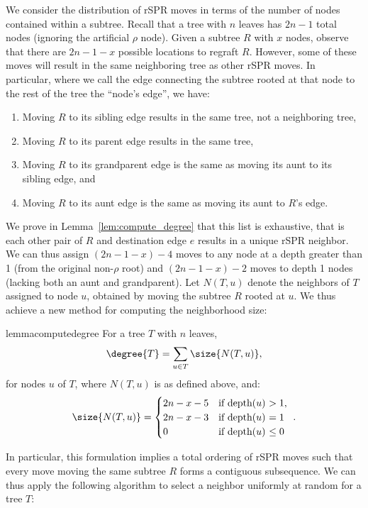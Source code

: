 \documentclass[11pt,onecolumn,conference]{IEEEtran}
\begin{document}
We consider the distribution of rSPR moves in terms of the number of nodes contained within a subtree.
Recall that a tree with $n$ leaves has $2n-1$ total nodes (ignoring the artificial $\rho$ node).
Given a subtree $R$ with $x$ nodes, observe that there are $2n-1 - x$ possible locations to regraft $R$.
However, some of these moves will result in the same neighboring tree as other rSPR moves.
In particular, where we call the edge connecting the subtree rooted at that node to the rest of the tree the ``node's edge'', we have:
\begin{enumerate}
\item Moving $R$ to its sibling edge results in the same tree, not a neighboring tree,
\item Moving $R$ to its parent edge results in the same tree,
\item Moving $R$ to its grandparent edge is the same as moving its aunt to its sibling edge, and
\item Moving $R$ to its aunt edge is the same as moving its aunt to $R$'s edge.
\end{enumerate}
We prove in Lemma~\ref{lem:compute_degree} that this list is exhaustive, that is each other pair of $R$ and destination edge $e$ results in a unique rSPR neighbor.
We can thus assign $(2n-1-x)-4$ moves to any node at a depth greater than 1 (from the original non-$\rho$ root) and $(2n-1-x)-2$ moves to depth 1 nodes (lacking both an aunt and grandparent).
Let $N(T,u)$ denote the neighbors of $T$ assigned to node $u$, obtained by moving the subtree $R$ rooted at $u$.
We thus achieve a new method for computing the neighborhood size:

\begin{restatable}{lemma}{computedegree}
	\label{lem:compute_degree}
	For a tree $T$ with $n$ leaves,
	$$\degree{T} = \sum_{u \in T} \size{N(T,u)},$$
	for nodes $u$ of $T$, where $N(T,u)$ is as defined above, and:
	$$\size{N(T,u)} = \begin{cases}
		2n - x - 5 &\text{if depth($u$) $ > 1$, } \\
		2n - x - 3 &\text{if depth($u$) $ = 1$ } \\
		0 &\text{if depth($u$) $ \le 0$ } \\
	\end{cases}.$$
\end{restatable}


In particular, this formulation implies a total ordering of rSPR moves such that every move moving the same subtree $R$ forms a contiguous subsequence.
We can thus apply the following algorithm to select a neighbor uniformly at random for a tree $T$:
\end{document}

